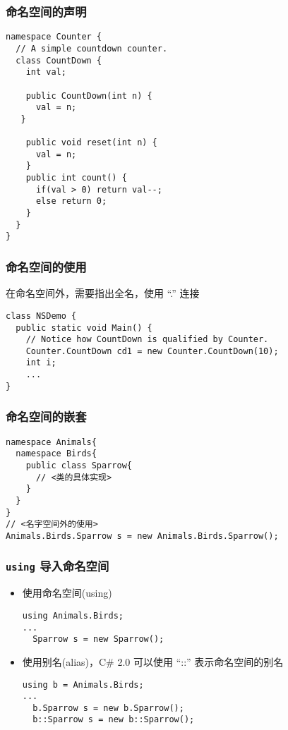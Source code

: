 \begin{frame}[fragile]
\frametitle{命名空间的声明}
\begin{lstlisting}
namespace Counter {
  // A simple countdown counter.
  class CountDown {
    int val;

    public CountDown(int n) {
      val = n;
   }

    public void reset(int n) {
      val = n;
    }
    public int count() {
      if(val > 0) return val--;
      else return 0;
    }
  }
}
\end{lstlisting}
\end{frame}

\begin{frame}[fragile]
\frametitle{命名空间的使用}
在命名空间外，需要指出全名，使用 ``.'' 连接
\begin{lstlisting}
class NSDemo {
  public static void Main() {
    // Notice how CountDown is qualified by Counter.
    Counter.CountDown cd1 = new Counter.CountDown(10);
    int i;
    ...
}
\end{lstlisting}
\end{frame}

\begin{frame}[fragile]
\frametitle{命名空间的嵌套}
\begin{lstlisting}[escapeinside=<>]
namespace Animals{
  namespace Birds{
    public class Sparrow{
      // <类的具体实现>
    }
  }
}
// <名字空间外的使用>
Animals.Birds.Sparrow s = new Animals.Birds.Sparrow();
\end{lstlisting}
\end{frame}

\begin{frame}[fragile]
\frametitle{\texttt{using} 导入命名空间}

\begin{itemize}
\item 使用命名空间(using)
\begin{lstlisting}
using Animals.Birds;
...
  Sparrow s = new Sparrow();
\end{lstlisting}
\item 使用别名(alias)，C\# 2.0 可以使用 ``::'' 表示命名空间的别名
\begin{lstlisting}
using b = Animals.Birds;
...
  b.Sparrow s = new b.Sparrow();
  b::Sparrow s = new b::Sparrow();
\end{lstlisting}
\end{itemize}
\end{frame}

